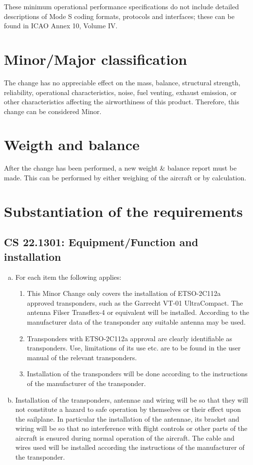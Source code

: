 \documentclass[twoside]{article}
\begin{document}
These minimum operational performance specifications do not include detailed descriptions of Mode S coding formats, protocols and interfaces; these can be found in ICAO Annex 10, Volume IV. 

\section{Minor/Major classification}
The change has no appreciable effect on the mass, balance, structural strength, reliability, operational characteristics, noise, fuel venting, exhaust emission, or other characteristics affecting the airworthiness of this product. Therefore, this change can be considered Minor.

\section{Weigth and balance}
After the change has been performed, a new weight \& balance report must be made. This can be performed by either weighing of the aircraft or by calculation.

\section{Substantiation of the requirements}

\subsection[CS 22.1301]{CS 22.1301:  Equipment/Function and installation}
\begin{enumerate}[(a)]
\item For each item the following applies:
\begin{enumerate}[(1)]
\item This Minor Change only covers the installation of ETSO-2C112a approved transponders, such as the Garrecht VT-01 UltraCompact. The antenna Filser Transflex-4 or equivalent will be installed. According to the manufacturer data of the transponder any suitable antenna may be used.
\item Transponders with ETSO-2C112a approval are clearly identifiable as transponders. Use, limitations of its use etc. are to be found in the user manual of the relevant transponders.
\item Installation of the transponders will be done according to the instructions of the manufacturer of the transponder.
\end{enumerate}
\item Installation of the transponders, antennae and wiring will be so that they will not constitute a hazard to safe operation by themselves or their effect upon the sailplane. In particular the installation of the antennae, its bracket and wiring will be so that no interference with flight controls or other parts of the aircraft is ensured during normal operation of the aircraft. The cable and wires used will be installed according the instructions of the manufacturer of the transponder.
\end{enumerate}
\end{document}
